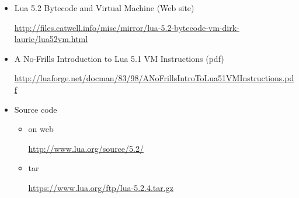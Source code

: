 \begin{frame}
	\frametitlesec
	\begin{itemize}
		\item Lua 5.2 Bytecode and Virtual Machine (Web site)

			{\tiny{\url{http://files.catwell.info/misc/mirror/lua-5.2-bytecode-vm-dirk-laurie/lua52vm.html}}}

		\item A No-Frills Introduction to Lua 5.1 VM Instructions (pdf)

			{\tiny\url{http://luaforge.net/docman/83/98/ANoFrillsIntroToLua51VMInstructions.pdf}}
		\item Source code
			\begin{itemize}
				\item on web

					{\tiny\url{http://www.lua.org/source/5.2/}}
				\item tar

					{\tiny\url{https://www.lua.org/ftp/lua-5.2.4.tar.gz}}
			\end{itemize}
	\end{itemize}
\end{frame}
